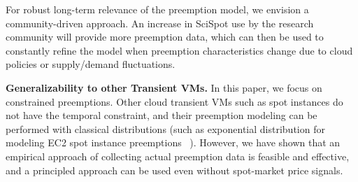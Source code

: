 For robust long-term relevance of the preemption model, we envision a community-driven approach.
An increase in SciSpot use by the research community will provide more preemption data, which can then be used to constantly refine the model when preemption characteristics change due to cloud policies or supply/demand fluctuations. 

\noindent \textbf{Generalizability to other Transient VMs.}
In this paper, we focus on constrained preemptions.
Other cloud transient VMs such as spot instances do not have the temporal constraint, and their preemption modeling can be performed with classical distributions (such as exponential distribution for modeling EC2 spot instance preemptions ~\cite{bid-cloud, flint, hotcloud-not-bid}). 
However, we have shown that an empirical approach of collecting actual preemption data is feasible and effective, and a principled approach can be used even without spot-market price signals. 


\begin{comment}
\noindent \textbf{\emph{Phase-wise} model.}
Our statistical analysis indicates that the preemption rates have three distinct phases. 
The analytical model derived in this work is continuously differentiable and allows capturing the three phases reasonably well. %
It may be possible to use a ``phase-wise'' model such as a piece-wise continuously differentiable model, where the three phases are modeled either as segmented linear regions (found using segmented linear regression), or an initial exponential phase and two linear phases. 
Such a piece-wise model could capture the phase transitions with even more accuracy.
Our analytical model informed by empirical data and based on well-defined assumptions can guide the development of such simpler heuristics and modeling approaches, as well as the interpretation of their results.
The analytical model also provides a measure to distill the contributions of effects ignored in its derivation (e.g., only 2 failure rates) in changing the VM expected lifetimes and checkpointing policies. At the same time, it also provides a principled approach to extend the model to more complex cases, e.g., systems characterized by processes with more than 2 failure rates. %
\end{comment}

